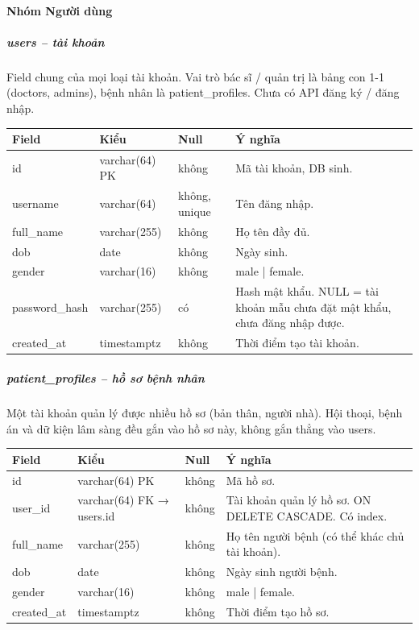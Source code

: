\paragraph{Nhóm Người dùng}

\subparagraph{users -- tài khoản}

Field chung của mọi loại tài khoản. Vai trò bác sĩ / quản trị là bảng con 1-1 (doctors, admins), bệnh nhân là patient\_profiles. Chưa có API đăng ký / đăng nhập.
\begin{longtable}{|>{\raggedright\arraybackslash}p{0.250\dimexpr\linewidth-8\tabcolsep\relax}|>{\raggedright\arraybackslash}p{0.250\dimexpr\linewidth-8\tabcolsep\relax}|>{\raggedright\arraybackslash}p{0.250\dimexpr\linewidth-8\tabcolsep\relax}|>{\raggedright\arraybackslash}p{0.250\dimexpr\linewidth-8\tabcolsep\relax}|}
\hline
\textbf{Field} & \textbf{Kiểu} & \textbf{Null} & \textbf{Ý nghĩa} \\ \hline
\endhead
id & varchar(64) PK & không & Mã tài khoản, DB sinh. \\ \hline
username & varchar(64) & không, unique & Tên đăng nhập. \\ \hline
full\_name & varchar(255) & không & Họ tên đầy đủ. \\ \hline
dob & date & không & Ngày sinh. \\ \hline
gender & varchar(16) & không & male | female. \\ \hline
password\_hash & varchar(255) & có & Hash mật khẩu. NULL = tài khoản mẫu chưa đặt mật khẩu, chưa đăng nhập được. \\ \hline
created\_at & timestamptz & không & Thời điểm tạo tài khoản. \\ \hline
\end{longtable}

\subparagraph{patient\_profiles -- hồ sơ bệnh nhân}

Một tài khoản quản lý được nhiều hồ sơ (bản thân, người nhà). Hội thoại, bệnh án và dữ kiện lâm sàng đều gắn vào hồ sơ này, không gắn thẳng vào users.
\begin{longtable}{|>{\raggedright\arraybackslash}p{0.227\dimexpr\linewidth-8\tabcolsep\relax}|>{\raggedright\arraybackslash}p{0.273\dimexpr\linewidth-8\tabcolsep\relax}|>{\raggedright\arraybackslash}p{0.250\dimexpr\linewidth-8\tabcolsep\relax}|>{\raggedright\arraybackslash}p{0.250\dimexpr\linewidth-8\tabcolsep\relax}|}
\hline
\textbf{Field} & \textbf{Kiểu} & \textbf{Null} & \textbf{Ý nghĩa} \\ \hline
\endhead
id & varchar(64) PK & không & Mã hồ sơ. \\ \hline
user\_id & varchar(64) FK → users.id & không & Tài khoản quản lý hồ sơ. ON DELETE CASCADE. Có index. \\ \hline
full\_name & varchar(255) & không & Họ tên người bệnh (có thể khác chủ tài khoản). \\ \hline
dob & date & không & Ngày sinh người bệnh. \\ \hline
gender & varchar(16) & không & male | female. \\ \hline
created\_at & timestamptz & không & Thời điểm tạo hồ sơ. \\ \hline
\end{longtable}

